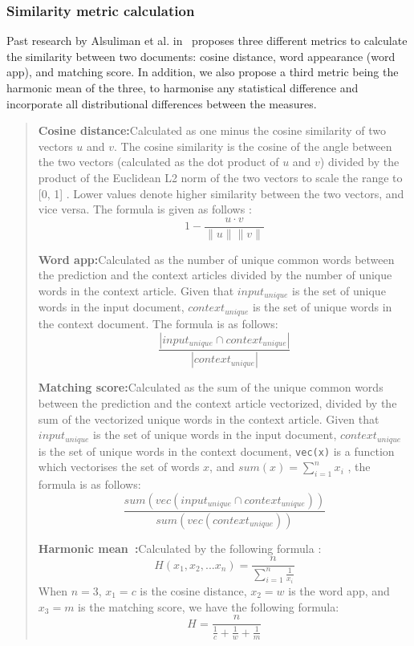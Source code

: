 \documentclass{article}
\begin{document}
\subsubsection{Similarity metric calculation} \label{section:similarity-metric}
Past research by Alsuliman et al. in~\cite{alsuliman2022social} proposes three different metrics to calculate the similarity between two documents: cosine distance, word appearance (word app), and matching score. In addition, we also propose a third metric being the harmonic mean of the three, to harmonise any statistical difference and incorporate all distributional differences between the measures.

\begin{quote}
  \textbf{Cosine distance:}\quad Calculated as one minus the cosine similarity of two vectors $u$ and $v$. The cosine similarity is the cosine of the angle between the two vectors (calculated as the dot product of $u$ and $v$) divided by the product of the Euclidean L2 norm of the two vectors to scale the range to [0, 1] \cite{scikit-learn}. Lower values denote higher similarity between the two vectors, and vice versa. The formula is given as follows \cite{scipy}:
  \[ 1 - \frac{u \cdot v}{\lVert u \rVert \lVert v \rVert}\]

  \textbf{Word app:}\quad Calculated as the number of unique common words between the prediction and the context articles divided by the number of unique words in the context article. Given that \texttt{$input_{unique}$} is the set of unique words in the input document, \texttt{$context_{unique}$} is the set of unique words in the context document. The formula is as follows:
  \[\frac{\left|input_{unique} \cap context_{unique}\right|}{\left|context_{unique}\right|}\]

  \textbf{Matching score:}\quad Calculated as the sum of the unique common words between the prediction and the context article vectorized, divided by the sum of the vectorized unique words in the context article. Given that \texttt{$input_{unique}$} is the set of unique words in the input document, \texttt{$context_{unique}$} is the set of unique words in the context document, \texttt{vec(x)} is a function which vectorises the set of words $x$, and $sum(x) = \sum_{i=1}^n x_i$ , the formula is as follows:
  \[\frac{sum(vec(input_{unique} \cap context_{unique}))}{sum(vec(context_{unique}))}\]

  \textbf{Harmonic mean~\cite{harmonic_mean}:}\quad Calculated by the following formula :
  \[H(x_1, x_2, ... x_n) = \frac{n}{\sum^n_{i=1}\frac{1}{x_i}}\]
  When $n = 3$, $x_1 = c$ is the cosine distance, $x_2 = w$ is the word app, and $x_3 = m$ is the matching score, we have the following formula:
  \[H = \frac{n}{\frac{1}{c} + \frac{1}{w} + \frac{1}{m}}\]
\end{quote}
\end{document}
